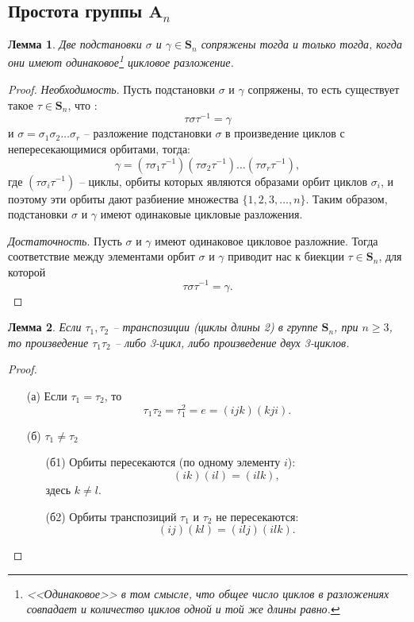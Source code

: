 \documentclass{article}
\newtheorem{lemma}{Лемма}[section]
\begin{document}
\subsection{Простота группы $\textbf{A}_n$}

\begin{lemma} \label{sajk}
    Две подстановки $\sigma $ и $ \gamma \in \mathbf{S}_n$ сопряжены тогда и только тогда, когда они имеют одинаковое\footnote{<<Одинаковое>> в том смысле, что общее число циклов в разложениях совпадает и количество циклов одной и той же длины равно.} цикловое разложение.
\end{lemma}
\begin{proof}
    \textit{Необходимость}. Пусть подстановки $\sigma$ и $\gamma$ сопряжены, то есть существует такое $\tau \in \mathbf{S}_n$, что : $$ \tau \sigma \tau^{-1} = \gamma $$ и $\sigma = \sigma_1 \sigma_2 \ldots \sigma_r$ -- разложение подстановки $\sigma$ в произведение циклов с непересекающимися орбитами, тогда: $$ \gamma = (\tau \sigma_1 \tau^{-1}) (\tau \sigma_2 \tau^{-1}) \ldots (\tau \sigma_r \tau^{-1}), $$ где $(\tau \sigma_i \tau^{-1})$ -- циклы, орбиты которых являются образами орбит циклов $\sigma_i$, и поэтому эти орбиты дают разбиение множества $\{ 1,2,3, \ldots, n \}$. Таким образом, подстановки  $\sigma $ и $ \gamma$ имеют одинаковые цикловые разложения.

    \textit{Достаточность}. Пусть $\sigma$ и $\gamma$ имеют одинаковое цикловое разложние. Тогда соответствие между элементами орбит $\sigma$ и $\gamma$ приводит нас к биекции $\tau \in \mathbf{S}_n$, для которой $$ \tau \sigma \tau^{-1} = \gamma. $$
\end{proof}

\begin{lemma} \label{th2h}
    Если $\tau_1, \tau_2$ -- транспозиции (циклы длины 2) в группе $\mathbf{S}_n$, при $n \geqslant 3$, то произведение $\tau_1 \tau_2$ -- либо 3-цикл, либо произведение двух 3-циклов.
\end{lemma}
\begin{proof}
    \begin{enumerate}
        \item[(а)] Если $\tau_1 = \tau_2$, то $$ \tau_1 \tau_2 = \tau_1^2 = e = (ijk)(kji). $$
        \item[(б)] $\tau_1 \neq \tau_2$
            \begin{enumerate}
                \item[(б1)] Орбиты пересекаются (по одному элементу $i$): $$ (ik)(il) = (ilk), $$ здесь $k \neq l$.
                \item[(б2)] Орбиты транспозиций $\tau_1$ и $\tau_2$ не пересекаются: $$ (ij)(kl) = (ilj)(ilk). $$
            \end{enumerate}
    \end{enumerate}
\end{proof}
\end{document}
